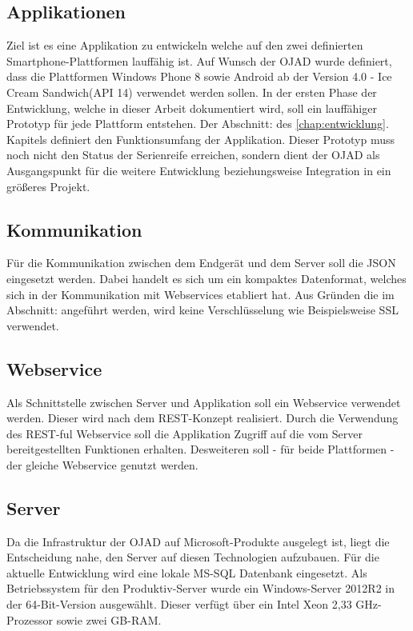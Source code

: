 \documentclass[Bachelorarbeit.tex]{subfiles}
\begin{document}
\subsection*{Applikationen}
Ziel ist es eine Applikation zu entwickeln welche auf den zwei definierten Smartphone-Plattformen lauffähig ist.
Auf Wunsch der \ac{OJAD} wurde definiert, dass die Plattformen Windows Phone 8 sowie Android ab der Version 4.0 - Ice Cream Sandwich(\ac{API} 14) verwendet werden sollen.
In der ersten Phase der Entwicklung, welche in dieser Arbeit dokumentiert wird, soll ein lauffähiger Prototyp für jede Plattform entstehen. 
Der Abschnitt:  des \ref{chap:entwicklung}. Kapitels definiert den Funktionsumfang der Applikation.
Dieser Prototyp muss noch nicht den Status der Serienreife erreichen, sondern dient der \ac{OJAD} als Ausgangspunkt für die weitere Entwicklung beziehungsweise Integration in ein größeres Projekt. 

\subsection*{Kommunikation}
Für die Kommunikation zwischen dem Endgerät und dem Server soll die \ac{JSON} eingesetzt werden. Dabei handelt es sich um ein kompaktes Datenformat, welches sich in der Kommunikation mit Webservices etabliert hat. 
Aus Gründen die im Abschnitt:  angeführt werden, wird keine Verschlüsselung wie Beispielsweise \ac{SSL} verwendet.

\subsection*{Webservice}
Als Schnittstelle zwischen Server und Applikation soll ein Webservice verwendet werden. 
Dieser wird nach dem \ac{REST}-Konzept realisiert. 
Durch die Verwendung des \ac{REST}-ful Webservice soll die Applikation Zugriff auf die vom Server bereitgestellten Funktionen erhalten.  
Desweiteren soll - für beide Plattformen - der gleiche Webservice genutzt werden.

\subsection*{Server}
Da die Infrastruktur der \ac{OJAD} auf Microsoft-Produkte ausgelegt ist, liegt die Entscheidung nahe, den Server auf diesen Technologien aufzubauen. Für die aktuelle Entwicklung wird eine lokale MS-SQL Datenbank eingesetzt. 
Als Betriebssystem für den Produktiv-Server wurde ein Windows-Server 2012R2 in der 64-Bit-Version ausgewählt. 
Dieser verfügt über ein Intel Xeon 2,33 GHz-Prozessor sowie zwei GB-RAM.
\end{document}
